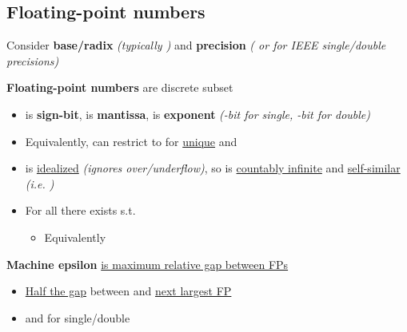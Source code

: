 \subsection*{Floating-point numbers}

Consider \textbf{base/radix}  \emph{(typically
      )} and \textbf{precision}  \emph{(
      or  for IEEE single/double precisions)}

\textbf{Floating-point numbers} are discrete subset
\begin{itemize}

      \item
             is \textbf{sign-bit},  is
            \textbf{mantissa},  is \textbf{exponent}
            \emph{(-bit for single, -bit for double)}
      \item
            Equivalently, can restrict to
             for \underline{unique}  and
      \item
             is \underline{idealized} 
            \emph{(ignores over/underflow)}, so is \underline{countably infinite} and \underline{self-similar}
            \emph{(i.e. )}
      \item
            For all  there exists  s.t.

            \begin{itemize}
                  \item
                        Equivalently
            \end{itemize}
\end{itemize}

\textbf{Machine epsilon}
\underline{is maximum relative gap between FPs}
\begin{itemize}
      \item
            \underline{Half the gap} between  and \underline{next largest FP}
      \item
             and
             for single/double
\end{itemize}

